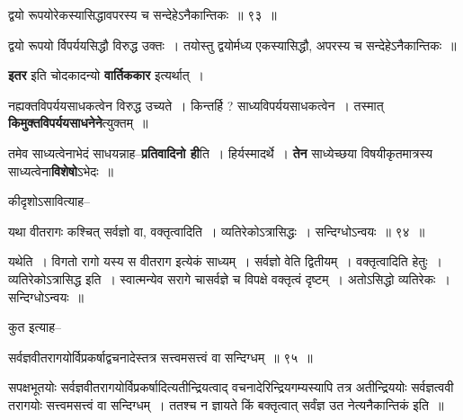 \documentclass[article,12pt,a4paper]{memoir}
\begin{document}
	  \bigskip
	  \begingroup
	

	  \pstart द्वयो रूपयोरेकस्यासिद्धावपरस्य च सन्देहेऽनैकान्तिकः ॥ ९३ ॥
	\pend
      
	  \endgroup
	 

	  \pstart द्वयो रूपयो र्विपर्ययसिद्धौ विरुद्ध उक्तः । तयोस्तु द्वयोर्मध्य एकस्यासिद्धौ, अपरस्य च सन्देहेऽनैकान्तिकः ॥
	\pend
      
	  \endgroup
	

	  \pstart \textbf{इतर} इति चोदकादन्यो \textbf{वार्तिककार} इत्यर्थात् ।
	\pend
      

	  \pstart नह्यक्तविपर्ययसाधकत्वेन विरुद्ध उच्यते । किन्तर्हि ? साध्यविपर्ययसाधकत्वेन । तस्मात् \textbf{किमुक्तविपर्ययसाधनेने}त्युक्तम् ॥
	\pend
      

	  \pstart तमेव साध्यत्वेनाभेदं साधयन्नाह--\textbf{प्रतिवादिनो ही}ति । हिर्यस्मादर्थे । \textbf{तेन} साध्येच्छया विषयीकृतमात्रस्य साध्यत्वेना\textbf{विशेषो}ऽभेदः ॥
	\pend
	  \bigskip
	  \begingroup
	

	  \pstart कीदृशोऽसावित्याह--
	\pend
        
	  \bigskip
	  \begingroup
	

	  \pstart यथा वीतरागः कश्चित् सर्वज्ञो वा, वक्तृत्वादिति । व्यतिरेकोऽत्रासिद्धः । सन्दिग्धोऽन्वयः ॥ ९४ ॥
	\pend
      
	  \endgroup
	 

	  \pstart यथेति । विगतो रागो यस्य स वीतराग इत्येकं साध्यम् । सर्वज्ञो वेति द्वितीयम् । वक्तृत्वादिति हेतुः । व्यतिरेकोऽत्रासिद्ध इति । स्वात्मन्येव सरागे चासर्वज्ञे च विपक्षे वक्तृत्वं दृष्टम् । अतोऽसिद्धो व्यतिरेकः । सन्दिग्धोऽन्वयः ॥
	\pend
        

	  \pstart कुत इत्याह--
	\pend
        
	  \bigskip
	  \begingroup
	

	  \pstart सर्वज्ञवीतरागयोर्विप्रकर्षाद्वचनादेस्तत्र सत्त्वमसत्त्वं वा सन्दिग्धम् ॥ ९५ ॥
	\pend
      
	  \endgroup
	 

	  \pstart सपक्षभूतयोः सर्वज्ञवीतरागयोर्विप्रकर्षादित्यतीन्द्रियत्वाद् वचनादेरिन्द्रियगम्यस्यापि तत्र अतीन्द्रिययोः सर्वज्ञत्ववी  तरागयोः सत्त्वमसत्त्वं वा सन्दिग्धम् । ततश्च न ज्ञायते किं बक्तृत्वात् सर्वंज्ञ उत नेत्यनैकान्तिकं इति ॥
	\pend
        
\end{document}
